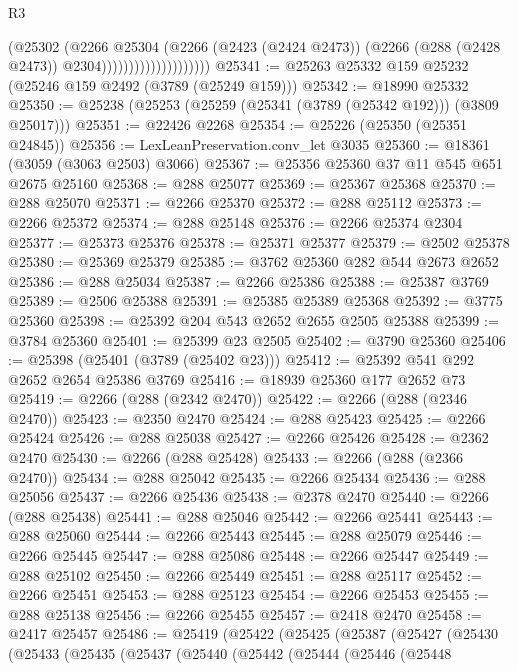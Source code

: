 \begin{lexlean}{R3}
\begin{coremodule}
                                    (@25302
                                      (@2266
                                        @25304
                                        (@2266
                                          (@2423 (@2424 @2473))
                                          (@2266 (@288 (@2428 @2473)) @2304))))))))))))))))))))
@25341 := @25263 @25332 @159 @25232 (@25246 @159 @2492 (@3789 (@25249 @159)))
@25342 := @18990 @25332
@25350 := @25238 (@25253 (@25259 (@25341 (@3789 (@25342 @192))) (@3809 @25017)))
@25351 := @22426 @2268
@25354 := @25226 (@25350 (@25351 @24845))
@25356 := LexLeanPreservation.conv_let @3035
@25360 := @18361 (@3059 (@3063 @2503) @3066)
@25367 := @25356 @25360 @37 @11 @545 @651 @2675 @25160
@25368 := @288 @25077
@25369 := @25367 @25368
@25370 := @288 @25070
@25371 := @2266 @25370
@25372 := @288 @25112
@25373 := @2266 @25372
@25374 := @288 @25148
@25376 := @2266 @25374 @2304
@25377 := @25373 @25376
@25378 := @25371 @25377
@25379 := @2502 @25378
@25380 := @25369 @25379
@25385 := @3762 @25360 @282 @544 @2673 @2652
@25386 := @288 @25034
@25387 := @2266 @25386
@25388 := @25387 @3769
@25389 := @2506 @25388
@25391 := @25385 @25389 @25368
@25392 := @3775 @25360
@25398 := @25392 @204 @543 @2652 @2655 @2505 @25388
@25399 := @3784 @25360
@25401 := @25399 @23 @2505
@25402 := @3790 @25360
@25406 := @25398 (@25401 (@3789 (@25402 @23)))
@25412 := @25392 @541 @292 @2652 @2654 @25386 @3769
@25416 := @18939 @25360 @177 @2652 @73
@25419 := @2266 (@288 (@2342 @2470))
@25422 := @2266 (@288 (@2346 @2470))
@25423 := @2350 @2470
@25424 := @288 @25423
@25425 := @2266 @25424
@25426 := @288 @25038
@25427 := @2266 @25426
@25428 := @2362 @2470
@25430 := @2266 (@288 @25428)
@25433 := @2266 (@288 (@2366 @2470))
@25434 := @288 @25042
@25435 := @2266 @25434
@25436 := @288 @25056
@25437 := @2266 @25436
@25438 := @2378 @2470
@25440 := @2266 (@288 @25438)
@25441 := @288 @25046
@25442 := @2266 @25441
@25443 := @288 @25060
@25444 := @2266 @25443
@25445 := @288 @25079
@25446 := @2266 @25445
@25447 := @288 @25086
@25448 := @2266 @25447
@25449 := @288 @25102
@25450 := @2266 @25449
@25451 := @288 @25117
@25452 := @2266 @25451
@25453 := @288 @25123
@25454 := @2266 @25453
@25455 := @288 @25138
@25456 := @2266 @25455
@25457 := @2418 @2470
@25458 := @2417 @25457
@25486 := @25419
    (@25422
      (@25425
        (@25387
          (@25427
            (@25430
              (@25433
                (@25435
                  (@25437
                    (@25440
                      (@25442
                        (@25444
                          (@25446
                            (@25448

\end{coremodule}
\end{lexlean}
